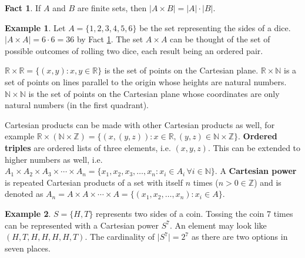 \documentclass[10pt]{article}
\newcommand{\R}{\mathbb{R}}
\newcommand{\N}{\mathbb{N}}
\newcommand{\Z}{\mathbb{Z}}
\theoremstyle{definition}
\newtheorem{example}{Example}
\newtheorem{fact}{Fact}
\begin{document}
\begin{fact}
    \label{cartcard}
    If $A$ and $B$ are finite sets, then $\left| A \times B\right| = \lvert A \rvert \cdot \lvert B \rvert$.
\end{fact}

\begin{example}
    Let $A = \{1,2,3,4,5,6\}$ be the set representing the sides of a dice. $|A \times A| = 6 \cdot 6 = 36$ by Fact \ref{cartcard}. The set $A \times A$ can be thought of the set of possible outcomes of rolling two dice, each result being an ordered pair.
\end{example}

$\R \times \R = \{(x,y):x,y\in \R\}$ is the set of points on the Cartesian plane. $\R \times \N$ is a set of points on lines parallel to the origin whose heights are natural numbers. $\N \times \N$ is the set of points on the Cartesian plane whose coordinates are only natural numbers (in the first quadrant).

Cartesian products can be made with other Cartesian products as well, for example $\R \times (\N \times \Z) = \{(x,(y,z)): x\in\R,(y,z)\in \N \times \Z\}$. \textbf{Ordered triples} are ordered lists of three elements, i.e. $(x,y,z)$. This can be extended to higher numbers as well, i.e. $A_1 \times A_2 \times A_3 \times \cdots \times A_n = \{x_1, x_2, x_3, \dots, x_n: x_i \in A_i \, \forall i \in \N\}$. A \textbf{Cartesian power} is repeated Cartesian products of a set with itself $n$ times ($n > 0 \in \Z$) and is denoted as $A_n = A \times A \times \cdots \times A = \{(x_1,x_2,\dots,x_n): x_i \in A\}$.

\begin{example}
    $S = \{H, T\}$ represents two sides of a coin. Tossing the coin 7 times can be represented with a Cartesian power $S^7$. An element may look like $(H,T,H,H,H,H,T)$. The cardinality of $\lvert S^7\rvert = 2^7$ as there are two options in seven places.
\end{example}
\end{document}
